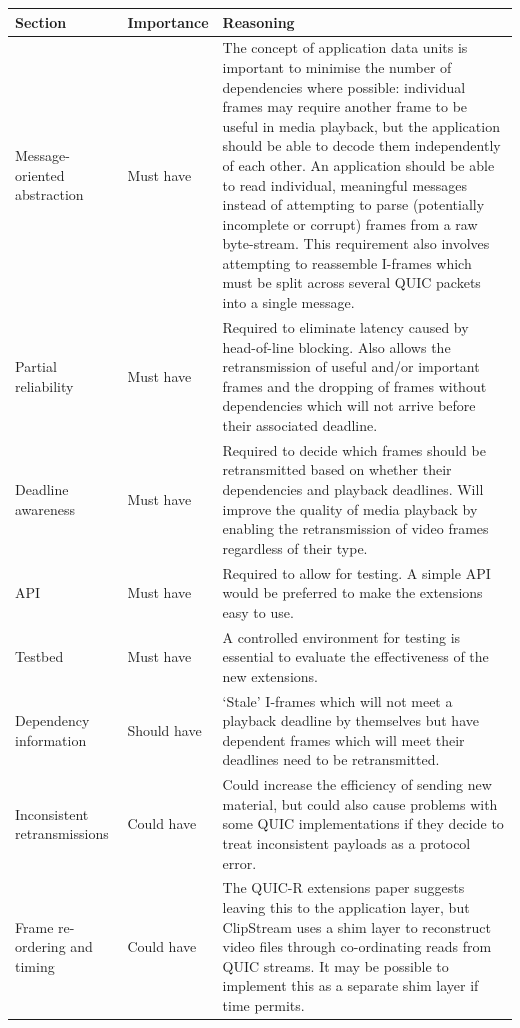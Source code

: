 \documentclass{mprop}
\begin{document}
\begin{longtable}{|p{3.5cm}|l|p{8.5cm}|} 
\hline
Section & Importance & Reasoning \\ \hline
Message-oriented abstraction  & Must have & The concept of application data units is important to minimise the number of dependencies where possible: individual frames may require another frame to be useful in media playback, but the application should be able to decode them independently of each other. An application should be able to read individual, meaningful messages instead of attempting to parse (potentially incomplete or corrupt) frames from a raw byte-stream. This requirement also involves attempting to reassemble I-frames which must be split across several QUIC packets into a single message. \\ \hline
Partial reliability & Must have & Required to eliminate latency caused by head-of-line blocking. Also allows the retransmission of useful and/or important frames and the dropping of frames without dependencies which will not arrive before their associated deadline. \\ \hline
Deadline awareness & Must have & Required to decide which frames should be retransmitted based on whether their dependencies and playback deadlines. Will improve the quality of media playback by enabling the retransmission of video frames regardless of their type. \\ \hline
API & Must have & Required to allow for testing. A simple API would be preferred to make the extensions easy to use. \\ \hline
Testbed & Must have & A controlled environment for testing is essential to evaluate the effectiveness of the new extensions. \\ \hline
Dependency information & Should have & `Stale' I-frames which will not meet a playback deadline by themselves but have dependent frames which will meet their deadlines need to be retransmitted. \\ \hline
Inconsistent retransmissions & Could have & Could increase the efficiency of sending new material, but could also cause problems with some QUIC implementations if they decide to treat inconsistent payloads as a protocol error. \\ \hline
Frame re-ordering and timing & Could have & The QUIC-R extensions paper suggests leaving this to the application layer, but ClipStream uses a shim layer to reconstruct video files through co-ordinating reads from QUIC streams. It may be possible to implement this as a separate shim layer if time permits. \\ \hline

\end{longtable}
\end{document}
